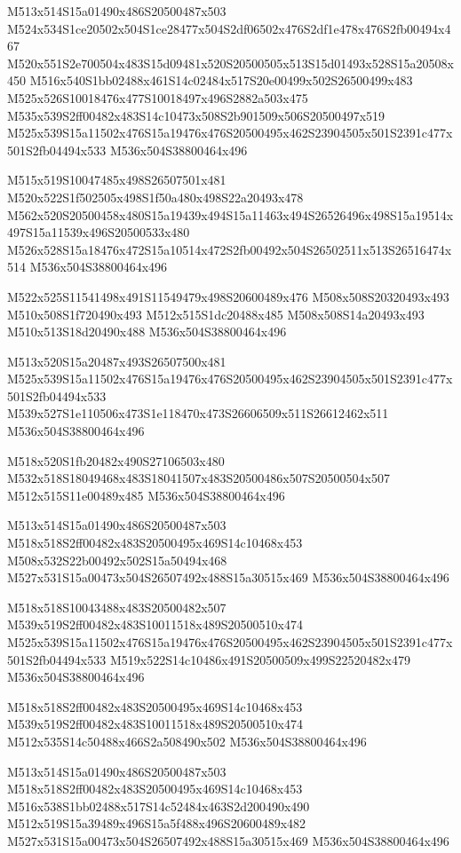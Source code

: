 \documentclass{article}
\begin{document}
\begin{multicols}{5}
\begin{center}
M513x514S15a01490x486S20500487x503 %
M524x534S1ce20502x504S1ce28477x504S2df06502x476S2df1e478x476S2fb00494x467 %
M520x551S2e700504x483S15d09481x520S20500505x513S15d01493x528S15a20508x450 %
M516x540S1bb02488x461S14c02484x517S20e00499x502S26500499x483 %
M525x526S10018476x477S10018497x496S2882a503x475 %
M535x539S2ff00482x483S14c10473x508S2b901509x506S20500497x519 %
M525x539S15a11502x476S15a19476x476S20500495x462S23904505x501S2391c477x501S2fb04494x533 %
M536x504S38800464x496 %

M515x519S10047485x498S26507501x481 %
M520x522S1f502505x498S1f50a480x498S22a20493x478 %
M562x520S20500458x480S15a19439x494S15a11463x494S26526496x498S15a19514x497S15a11539x496S20500533x480 %
M526x528S15a18476x472S15a10514x472S2fb00492x504S26502511x513S26516474x514 %
M536x504S38800464x496 %

M522x525S11541498x491S11549479x498S20600489x476 %
M508x508S20320493x493 %
M510x508S1f720490x493 %
M512x515S1dc20488x485 %
M508x508S14a20493x493 %
M510x513S18d20490x488 %
M536x504S38800464x496 %

M513x520S15a20487x493S26507500x481 %
M525x539S15a11502x476S15a19476x476S20500495x462S23904505x501S2391c477x501S2fb04494x533 %
M539x527S1e110506x473S1e118470x473S26606509x511S26612462x511 %
M536x504S38800464x496 %

M518x520S1fb20482x490S27106503x480 %
M532x518S18049468x483S18041507x483S20500486x507S20500504x507 %
M512x515S11e00489x485 %
M536x504S38800464x496 %

M513x514S15a01490x486S20500487x503 %
M518x518S2ff00482x483S20500495x469S14c10468x453 %
M508x532S22b00492x502S15a50494x468 %
M527x531S15a00473x504S26507492x488S15a30515x469 %
M536x504S38800464x496 %

M518x518S10043488x483S20500482x507 %
M539x519S2ff00482x483S10011518x489S20500510x474 %
M525x539S15a11502x476S15a19476x476S20500495x462S23904505x501S2391c477x501S2fb04494x533 %
M519x522S14c10486x491S20500509x499S22520482x479 %
M536x504S38800464x496 %

M518x518S2ff00482x483S20500495x469S14c10468x453 %
M539x519S2ff00482x483S10011518x489S20500510x474 %
M512x535S14c50488x466S2a508490x502 %
M536x504S38800464x496 %

M513x514S15a01490x486S20500487x503 %
M518x518S2ff00482x483S20500495x469S14c10468x453 %
M516x538S1bb02488x517S14c52484x463S2d200490x490 %
M512x519S15a39489x496S15a5f488x496S20600489x482 %
M527x531S15a00473x504S26507492x488S15a30515x469 %
M536x504S38800464x496 %


\end{center}
\end{multicols}
\end{document}
